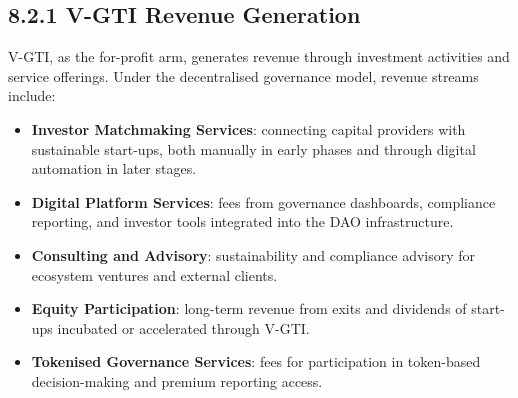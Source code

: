 \documentclass[
  english,
  12pt,
  oneside,
  open=any]{scrbook}
\providecommand{\tightlist}{%
  \setlength{\itemsep}{0pt}\setlength{\parskip}{0pt}}\usepackage{longtable,booktabs,array}
\begin{document}
\subsection{8.2.1 V-GTI Revenue Generation}\label{sec-vgti}

V-GTI, as the for-profit arm, generates revenue through investment
activities and service offerings. Under the decentralised governance
model, revenue streams include:

\begin{itemize}
\tightlist
\item
  \textbf{Investor Matchmaking Services}: connecting capital providers
  with sustainable start-ups, both manually in early phases and through
  digital automation in later stages.\\
\item
  \textbf{Digital Platform Services}: fees from governance dashboards,
  compliance reporting, and investor tools integrated into the DAO
  infrastructure.\\
\item
  \textbf{Consulting and Advisory}: sustainability and compliance
  advisory for ecosystem ventures and external clients.\\
\item
  \textbf{Equity Participation}: long-term revenue from exits and
  dividends of start-ups incubated or accelerated through V-GTI.\\
\item
  \textbf{Tokenised Governance Services}: fees for participation in
  token-based decision-making and premium reporting access.
\end{itemize}
\end{document}
